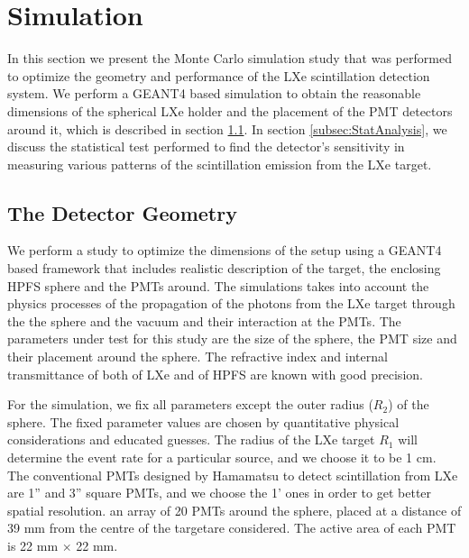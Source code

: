 \section{Simulation}
\label{sec:sim}
In this section we present the Monte Carlo simulation study that was performed to optimize the 
geometry and performance of the LXe scintillation detection system. We perform a GEANT4 based 
simulation to obtain the reasonable dimensions of the spherical LXe holder and the placement of 
the PMT detectors around it, which is described in section \ref{subsec:DetGeometry}. In 
section \ref{subsec:StatAnalysis}, we discuss the statistical test performed to find the 
detector's sensitivity in measuring various patterns of the scintillation emission from 
the LXe target.

\subsection{The Detector Geometry}
\label{subsec:DetGeometry}
 We perform a study to optimize the dimensions of the setup using a GEANT4 based framework
 that includes realistic description of the  target, the enclosing HPFS sphere and the PMTs 
 around. The simulations takes into account the physics processes of the propagation of the photons 
 from the LXe  target through the the sphere and the vacuum and their interaction at the PMTs. 
 The parameters under test for this study are the size of the sphere, the PMT size and their 
 placement around the sphere. The refractive index and internal transmittance of both 
 of LXe and of HPFS are known with good precision. 
 
 For the simulation, we fix all parameters except the outer radius ($R_{2}$) of the sphere. The fixed 
 parameter values are chosen by quantitative physical considerations and educated guesses.
The radius of the LXe target $R_{1}$ will determine the event rate for a particular 
source, and we choose it to  be 1 cm. The conventional PMTs designed by Hamamatsu to 
detect scintillation from LXe are 1'' and 3'' square PMTs, and we choose the 1' ones in order 
to get better spatial resolution. an array of 20 PMTs around the sphere, placed at a distance of 
39 mm from the centre of the targetare considered. The active area of each PMT is 22 mm $\times$ 22 mm.

